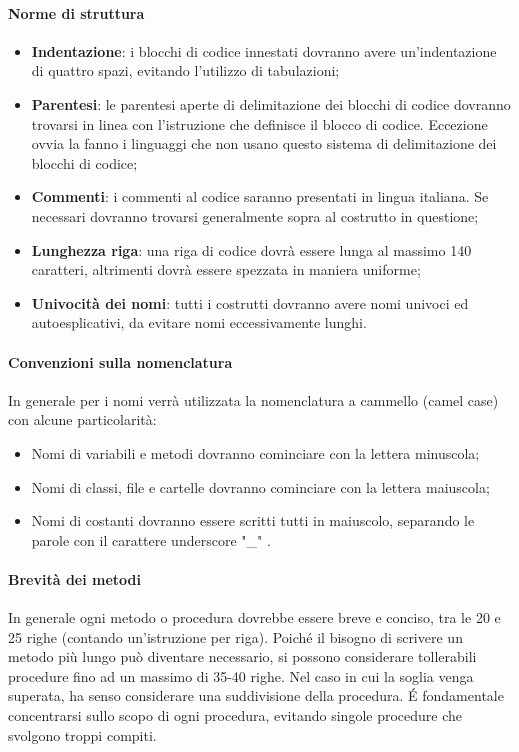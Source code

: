 \paragraph{Norme di struttura}
\begin{itemize}
\item \textbf{Indentazione}: i blocchi di codice innestati dovranno avere un’indentazione di quattro spazi, evitando l'utilizzo di tabulazioni;
\item \textbf{Parentesi}: le parentesi aperte di delimitazione dei blocchi di codice dovranno trovarsi in linea con l'istruzione che definisce il blocco di codice. Eccezione ovvia la fanno i linguaggi che non usano questo sistema di delimitazione dei blocchi di codice;
\item \textbf{Commenti}: i commenti al codice saranno presentati in lingua italiana. Se necessari dovranno trovarsi generalmente sopra al costrutto in questione;
\item \textbf{Lunghezza riga}: una riga di codice dovrà essere lunga al massimo 140 caratteri, altrimenti dovrà essere spezzata in maniera uniforme;
\item  \textbf{Univocità dei nomi}: tutti i costrutti dovranno avere nomi univoci ed autoesplicativi, da evitare nomi eccessivamente lunghi.
\end{itemize}

\paragraph{Convenzioni sulla nomenclatura}
In generale per i nomi verrà utilizzata la nomenclatura a cammello (camel case) con alcune particolarità:
\begin{itemize}
\item Nomi di variabili e metodi dovranno cominciare con la lettera minuscola;
\item Nomi di classi, file e cartelle dovranno cominciare con la lettera maiuscola;
\item Nomi di costanti dovranno essere scritti tutti in maiuscolo, separando le parole con il carattere underscore "\_" .
\end{itemize}

\paragraph{Brevità dei metodi}
In generale ogni metodo o procedura dovrebbe essere breve e conciso, tra le 20 e 25 righe (contando un'istruzione per riga). Poiché il bisogno di scrivere un metodo più lungo può diventare necessario, si possono considerare tollerabili procedure fino ad un massimo di 35-40 righe. Nel caso in cui la soglia venga superata, ha senso considerare una suddivisione della procedura. \'E fondamentale concentrarsi sullo scopo di ogni procedura, evitando singole procedure che svolgono troppi compiti.

